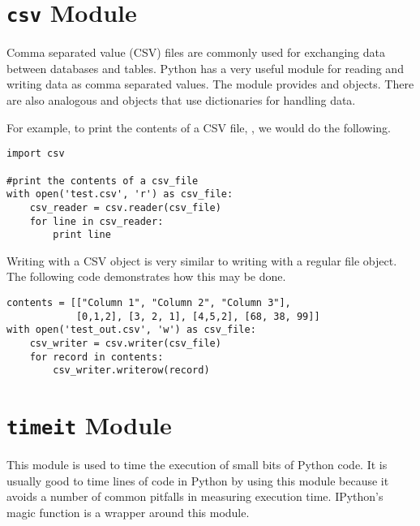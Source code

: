 \section*{\texttt{csv} Module}
Comma separated value (CSV) files are commonly used for exchanging data between databases and tables. 
Python has a very useful module for reading and writing data as comma separated values.
The  module provides  and  objects.
There are also analogous  and  objects that use dictionaries for handling data.

For example, to print the contents of a CSV file, , we would do the following.
\begin{lstlisting}
import csv

#print the contents of a csv_file
with open('test.csv', 'r') as csv_file:
    csv_reader = csv.reader(csv_file)
    for line in csv_reader:
        print line
\end{lstlisting}

Writing with a CSV  object is very similar to writing with a regular file object.
The following code demonstrates how this may be done.
\begin{lstlisting}
contents = [["Column 1", "Column 2", "Column 3"],
            [0,1,2], [3, 2, 1], [4,5,2], [68, 38, 99]]
with open('test_out.csv', 'w') as csv_file:
    csv_writer = csv.writer(csv_file)
    for record in contents:
        csv_writer.writerow(record)
\end{lstlisting}

\section*{\texttt{timeit} Module}
This module is used to time the execution of small bits of Python code.
It is usually good to time lines of code in Python by using this module because it avoids a number of common pitfalls in measuring execution time.
IPython's  magic function is a wrapper around this module.

